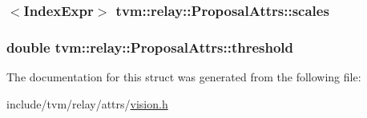 \subsubsection[{\texorpdfstring{scales}{scales}}]{$<${\bf Index\+Expr}$>$ tvm\+::relay\+::\+Proposal\+Attrs\+::scales}\hypertarget{structtvm_1_1relay_1_1ProposalAttrs_a0fbb2676833987768b1062753e2df1a3}{}\label{structtvm_1_1relay_1_1ProposalAttrs_a0fbb2676833987768b1062753e2df1a3}
\subsubsection[{\texorpdfstring{threshold}{threshold}}]{\setlength{\rightskip}{0pt plus 5cm}double tvm\+::relay\+::\+Proposal\+Attrs\+::threshold}\hypertarget{structtvm_1_1relay_1_1ProposalAttrs_ae8473a10238c2e4f21875b7e40cbdc10}{}\label{structtvm_1_1relay_1_1ProposalAttrs_ae8473a10238c2e4f21875b7e40cbdc10}


The documentation for this struct was generated from the following file\+:\begin{DoxyCompactItemize}
\item 
include/tvm/relay/attrs/\hyperlink{vision_8h}{vision.\+h}\end{DoxyCompactItemize}
